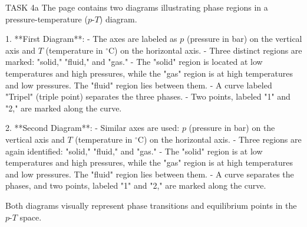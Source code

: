 TASK 4a  
The page contains two diagrams illustrating phase regions in a pressure-temperature (\( p \)-\( T \)) diagram.  

1. **First Diagram**:  
   - The axes are labeled as \( p \) (pressure in bar) on the vertical axis and \( T \) (temperature in \( ^\circ \text{C} \)) on the horizontal axis.  
   - Three distinct regions are marked: "solid," "fluid," and "gas."  
   - The "solid" region is located at low temperatures and high pressures, while the "gas" region is at high temperatures and low pressures. The "fluid" region lies between them.  
   - A curve labeled "Tripel" (triple point) separates the three phases.  
   - Two points, labeled "1" and "2," are marked along the curve.  

2. **Second Diagram**:  
   - Similar axes are used: \( p \) (pressure in bar) on the vertical axis and \( T \) (temperature in \( ^\circ \text{C} \)) on the horizontal axis.  
   - Three regions are again identified: "solid," "fluid," and "gas."  
   - The "solid" region is at low temperatures and high pressures, while the "gas" region is at high temperatures and low pressures. The "fluid" region lies between them.  
   - A curve separates the phases, and two points, labeled "1" and "2," are marked along the curve.  

Both diagrams visually represent phase transitions and equilibrium points in the \( p \)-\( T \) space.